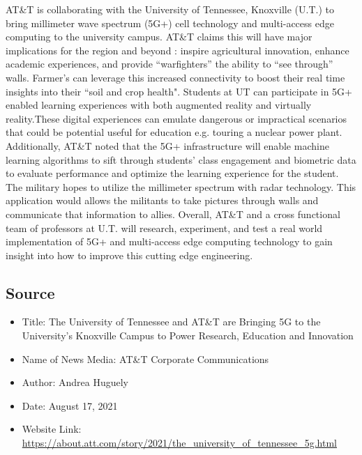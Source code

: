 \documentclass{article}
\begin{document}
AT\&T is collaborating with the University of Tennessee, Knoxville (U.T.) to bring millimeter wave spectrum
(5G+) cell technology and multi-access edge computing to the university campus. AT\&T claims this will have major 
implications for the region and beyond : inspire agricultural innovation, enhance academic experiences, and provide ``warfighters''
the ability to ``see through'' walls. Farmer's can leverage this increased connectivity to boost 
their real time insights into their ``soil and crop health".
Students at UT  can participate in 5G+ enabled learning experiences with both
augmented reality and virtually reality.These digital experiences 
can emulate dangerous or impractical scenarios that could be potential useful
for education e.g. touring a nuclear power plant.  
Additionally, AT\&T noted that the 5G+ infrastructure
will enable machine learning algorithms to sift through students' class engagement and biometric data to evaluate performance and optimize the learning experience for the student.
The military hopes to utilize the millimeter spectrum with radar technology. This application would allows the militants to take pictures through walls and communicate
that information to allies. Overall,
AT\&T and a cross functional team of professors at U.T.
will research, experiment, and test a real world implementation of
5G+ and multi-access edge computing technology to gain insight into how to improve this cutting edge engineering.


\subsection*{Source}

\begin{itemize}
  \item Title: The University of Tennessee and AT\&T are Bringing 5G to the
University’s Knoxville Campus to Power Research, Education and
Innovation
  \item Name of News Media: AT\&T Corporate Communications
  \item Author: Andrea Huguely
  \item Date: August 17, 2021
  \item Website Link: \url{https://about.att.com/story/2021/the_university_of_tennessee_5g.html}
\end{itemize}
\end{document}
